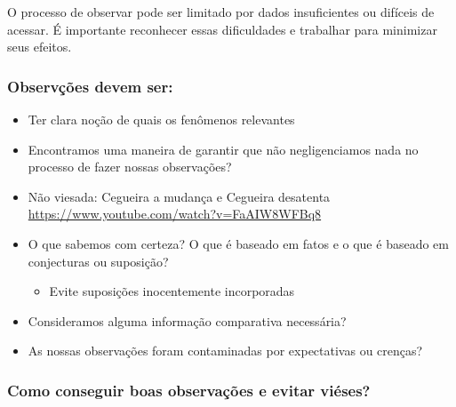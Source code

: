 \documentclass[
  letterpaper,
  DIV=11,
  numbers=noendperiod]{scrreprt}
\providecommand{\tightlist}{%
  \setlength{\itemsep}{0pt}\setlength{\parskip}{0pt}}
\begin{document}
\begin{tcolorbox}[enhanced jigsaw, leftrule=.75mm, coltitle=black, colframe=quarto-callout-note-color-frame, toprule=.15mm, opacitybacktitle=0.6, bottomtitle=1mm, bottomrule=.15mm, titlerule=0mm, toptitle=1mm, title=\textcolor{quarto-callout-note-color}{\faInfo}\hspace{0.5em}{Nem sempre a observação é simples ou direta.}, arc=.35mm, breakable, opacityback=0, colbacktitle=quarto-callout-note-color!10!white, colback=white, left=2mm, rightrule=.15mm]

O processo de observar pode ser limitado por dados insuficientes ou
difíceis de acessar. É importante reconhecer essas dificuldades e
trabalhar para minimizar seus efeitos.

\end{tcolorbox}

\subsubsection{Observções devem ser:}\label{observuxe7uxf5es-devem-ser}

\begin{itemize}
\tightlist
\item
  Ter clara noção de quais os fenômenos relevantes
\item
  Encontramos uma maneira de garantir que não negligenciamos nada no
  processo de fazer nossas observações?
\item
  Não viesada: Cegueira a mudança e Cegueira desatenta
  \url{https://www.youtube.com/watch?v=FaAIW8WFBq8}
\item
  O que sabemos com certeza? O que é baseado em fatos e o que é baseado
  em conjecturas ou suposição?

  \begin{itemize}
  \tightlist
  \item
    Evite suposições inocentemente incorporadas
  \end{itemize}
\item
  Consideramos alguma informação comparativa necessária?
\item
  As nossas observações foram contaminadas por expectativas ou crenças?
\end{itemize}

\subsubsection{Como conseguir boas observações e evitar
viéses?}\label{como-conseguir-boas-observauxe7uxf5es-e-evitar-viuxe9ses}
\end{document}
